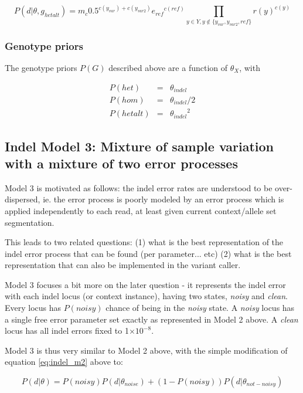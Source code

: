 \documentclass{article}
\newcommand{\e}[1]{\ensuremath{\times 10^{#1}}}
\begin{document}
\begin{equation*}
P (d \vert \theta, g_{hetalt}) = m_c 0.5^{c(y_{var})+c(y_{var2})} {e_{ref}}^{c(ref)} \prod_{y \in Y, y \not\in \{y_{var},y_{var2},ref\}} r(y)^{c(y)}
\end{equation*}


\subsubsection{Genotype priors}

The genotype priors $P(G)$ described above are a function of $\theta_X$, with

\begin{eqnarray*}
P(het) &=& \theta_{indel} \\
P(hom) &=& \theta_{indel} / 2 \\
P(hetalt) &=& {\theta_{indel}}^2
\end{eqnarray*}


\subsection{Indel Model 3: Mixture of sample variation with a mixture of two error processes}

Model 3 is motivated as follows: the indel error rates are understood to be over-dispersed, ie. the error process is poorly modeled by an error process which is applied independently to each read, at least given current context/allele set segmentation.

This leads to two related questions: (1) what is the best representation of the indel error process that can be found (per parameter... etc) (2) what is the best representation that can also be implemented in the variant caller.

Model 3 focuses a bit more on the later question - it represents the indel error with each indel locus (or context instance), having two states, \emph{noisy} and \emph{clean}. Every locus has $P(noisy)$ chance of being in the \emph{noisy} state. A \emph{noisy} locus has a single free error parameter set exactly as represented in Model 2 above. A \emph{clean} locus has all indel errors fixed to 1\e{-8}.

Model 3 is thus very similar to Model 2 above, with the simple modification of equation \ref{eq:indel_m2} above to:

\begin{equation}
P(d \vert \theta) = P(noisy) P (d \vert \theta_{noise}) + (1-P(noisy)) P (d \vert \theta_{not-noisy})
\end{equation}
\end{document}
